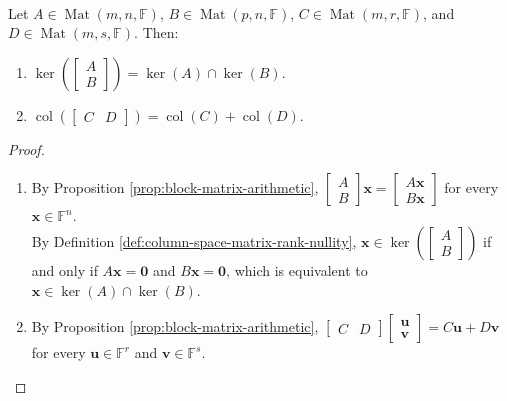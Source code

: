 \begin{proposition} \label{prop:stacked-nullspaces-and-concatenated-column-spaces} \\
Let $A\in\operatorname{Mat}(m,n,\mathbb{F})$, $B\in\operatorname{Mat}(p,n,\mathbb{F})$, $C\in\operatorname{Mat}(m,r,\mathbb{F})$, and $D\in\operatorname{Mat}(m,s,\mathbb{F})$. Then:
\begin{enumerate}[label=(\roman*)]
\setlength{\itemsep}{0pt}
\item $\ker\!\left(\left[\begin{smallmatrix}A\\B\end{smallmatrix}\right]\right)=\ker(A)\cap\ker(B)$.
\item $\operatorname{col}\!\left(\left[\begin{smallmatrix}C&D\end{smallmatrix}\right]\right)=\operatorname{col}(C)+\operatorname{col}(D)$.
\end{enumerate}
\begin{proof}
\begin{enumerate}[label=(\roman*)]
\setlength{\itemsep}{0pt}
\item By Proposition \ref{prop:block-matrix-arithmetic}, $\left[\begin{smallmatrix}A\\B\end{smallmatrix}\right]\mathbf{x}=\left[\begin{smallmatrix}A\mathbf{x}\\B\mathbf{x}\end{smallmatrix}\right]$ for every $\mathbf{x}\in\mathbb{F}^n$.\\
By Definition \ref{def:column-space-matrix-rank-nullity}, $\mathbf{x}\in\ker\!\left(\left[\begin{smallmatrix}A\\B\end{smallmatrix}\right]\right)$ if and only if $A\mathbf{x}=\mathbf{0}$ and $B\mathbf{x}=\mathbf{0}$, which is equivalent to $\mathbf{x}\in\ker(A)\cap\ker(B)$.
\item By Proposition \ref{prop:block-matrix-arithmetic}, $\left[\begin{smallmatrix}C&D\end{smallmatrix}\right]\left[\begin{smallmatrix}\mathbf{u}\\\mathbf{v}\end{smallmatrix}\right]=C\mathbf{u}+D\mathbf{v}$ for every $\mathbf{u}\in\mathbb{F}^r$ and $\mathbf{v}\in\mathbb{F}^s$.\\

\end{enumerate}
\end{proof}
\end{proposition}
